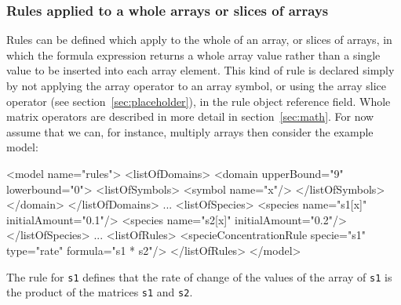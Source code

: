 \documentclass{cekarticle}
\begin{document}
\subsubsection{Rules applied to a whole arrays or slices of arrays}

Rules can be defined which apply to the whole of an array, or
slices of arrays, in which the formula expression returns a whole
array value rather than a single value to be inserted into each
array element.  This kind of rule is declared simply by not
applying the array operator to an array symbol, or using the array
slice operator (see section~\ref{sec:placeholder}), in the rule
object reference field.  Whole matrix operators are described in
more detail in section~\ref{sec:math}.  For now assume that we
can, for instance, multiply arrays then consider the example
model:

\begin{example}
<model name="rules">
    <listOfDomains>
        <domain upperBound="9" lowerbound="0">
            <listOfSymbols>
                <symbol name="x"/>
            </listOfSymbols>
        </domain>
    </listOfDomains>
    ...
    <listOfSpecies>
        <species name="s1[x]" initialAmount="0.1"/>
        <species name="s2[x]" initialAmount="0.2"/>
    </listOfSpecies>
    ...
    <listOfRules>
        <specieConcentrationRule specie="s1" type="rate" formula="s1 * s2"/>
    </listOfRules>
</model>
\end{example}

The rule for \texttt{s1} defines that the rate of change of the
values of the array of \texttt{s1} is the product of the matrices
\texttt{s1} and \texttt{s2}.
\end{document}
